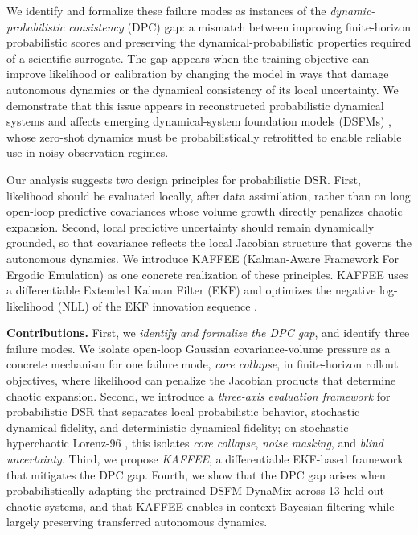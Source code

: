 \documentclass{article}
\theoremstyle{plain}
\theoremstyle{definition}
\theoremstyle{remark}
\begin{document}
We identify and formalize these failure modes as instances of the \emph{dynamic-probabilistic consistency} (DPC) gap: a mismatch between improving finite-horizon probabilistic scores and preserving the dynamical-probabilistic properties required of a scientific surrogate.
The gap appears when the training objective can improve likelihood or calibration by changing the model in ways that damage autonomous dynamics or the dynamical consistency of its local uncertainty. We demonstrate that this issue appears in reconstructed probabilistic dynamical systems and affects emerging dynamical-system foundation models (DSFMs) \citep{hemmer2025true,lai2026panda,liu2025chaosnexus}, whose zero-shot dynamics must be probabilistically retrofitted to enable reliable use in noisy observation regimes.

Our analysis suggests two design principles for probabilistic DSR. First, likelihood should be evaluated locally, after data assimilation, rather than on long open-loop predictive covariances whose volume growth directly penalizes chaotic expansion. Second, local predictive uncertainty should remain dynamically grounded, so that covariance reflects the local Jacobian structure that governs the autonomous dynamics. We introduce KAFFEE (Kalman-Aware Framework For Ergodic Emulation) as one concrete realization of these principles. KAFFEE uses a differentiable Extended Kalman Filter (EKF) and optimizes the negative log-likelihood (NLL) of the EKF innovation sequence \citep{gupta1974computational, gorad2020parameter, sarkka2023bayesian, kokkala2016sigmapoint, haarnoja2016backprop,tanoh2026identifying}.

\textbf{Contributions.}
First, we \emph{identify and formalize the DPC gap}, and identify three failure modes.
We isolate open-loop Gaussian covariance-volume pressure as a concrete mechanism for one failure mode, \emph{core collapse}, in finite-horizon rollout objectives, where likelihood can penalize the Jacobian products that determine chaotic expansion.
Second, we introduce a \emph{three-axis evaluation framework} for probabilistic DSR that separates local probabilistic behavior, stochastic dynamical fidelity, and deterministic dynamical fidelity; on stochastic hyperchaotic Lorenz-96 \citep{lorenz1996predictability}, this isolates \emph{core collapse}, \emph{noise masking}, and \emph{blind uncertainty}.
Third, we propose \emph{KAFFEE}, a differentiable EKF-based framework that mitigates the DPC gap.
Fourth, we show that the DPC gap arises when probabilistically adapting the pretrained DSFM DynaMix \citep{hemmer2025true} across 13 held-out chaotic systems, and that KAFFEE enables in-context Bayesian filtering while largely preserving transferred autonomous dynamics.
\end{document}
